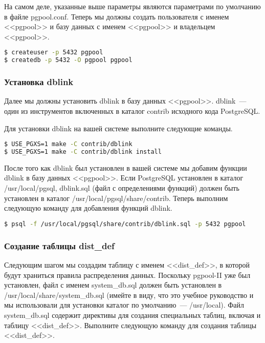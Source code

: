 На самом деле, указанные выше параметры являются параметрами по умолчанию в файле pgpool.conf. Теперь мы должны создать пользователя с именем <<pgpool>> и базу данных с именем <<pgpool>> и владельцем <<pgpool>>.

\begin{lstlisting}[language=Bash,label=lst:pgpool27,caption=Настройка SystemDB]
$ createuser -p 5432 pgpool
$ createdb -p 5432 -O pgpool pgpool
\end{lstlisting}

\subsubsection{Установка dblink}

Далее мы должны установить dblink в базу данных <<pgpool>>. dblink~--- один из инструментов включенных в каталог contrib исходного кода PostgreSQL.

Для установки dblink на вашей системе выполните следующие команды.

\begin{lstlisting}[language=Bash,label=lst:pgpool28,caption=Установка dblink]
$ USE_PGXS=1 make -C contrib/dblink
$ USE_PGXS=1 make -C contrib/dblink install
\end{lstlisting}

После того как dblink был установлен в вашей системе мы добавим функции dblink в базу данных <<pgpool>>. Если PostgreSQL установлен в каталог /usr/local/pgsql, dblink.sql (файл с определениями функций) должен быть установлен в каталог /usr/local/pgsql/share/contrib. Теперь выполним следующую команду для добавления функций dblink.

\begin{lstlisting}[language=Bash,label=lst:pgpool29,caption=Установка dblink]
$ psql -f /usr/local/pgsql/share/contrib/dblink.sql -p 5432 pgpool
\end{lstlisting}

\subsubsection{Создание таблицы dist\_def}

Следующим шагом мы создадим таблицу с именем <<dist\_def>>, в которой будут храниться правила распределения данных. Поскольку pgpool-II уже был установлен, файл с именем system\_db.sql должен быть установлен в /usr/local/share/system\_db.sql (имейте в виду, что это учебное руководство и мы использовали для установки каталог по умолчанию~--- /usr/local). Файл system\_db.sql содержит директивы для создания специальных таблиц, включая и таблицу <<dist\_def>>. Выполните следующую команду для создания таблицы <<dist\_def>>.

